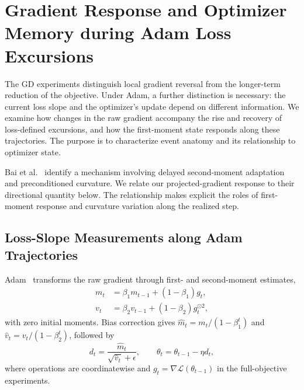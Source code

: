 
\section{Gradient Response and Optimizer Memory during Adam Loss Excursions}
\label{sec:adam-diagnostics}

The GD experiments distinguish local gradient reversal from the longer-term
reduction of the objective. Under Adam, a further distinction is necessary:
the current loss slope and the optimizer's update depend on different
information. We examine how changes in the raw gradient accompany the rise
and recovery of loss-defined excursions, and how the first-moment state
responds along these trajectories. The purpose is to characterize event
anatomy and its relationship to optimizer state.

Bai et al.~\cite{bai2026adaptive} identify a mechanism involving delayed
second-moment adaptation and preconditioned curvature. We relate our
projected-gradient response to their directional quantity below. The
relationship makes explicit the roles of first-moment response and
curvature variation along the realized step.

\subsection{Loss-Slope Measurements along Adam Trajectories}

Adam~\cite{kingma2014adam} transforms the raw gradient through first-
and second-moment estimates,
\begin{equation}
\begin{aligned}
m_t&=\beta_1m_{t-1}+(1-\beta_1)g_t,\\
v_t&=\beta_2v_{t-1}+(1-\beta_2)g_t^{\odot2},
\end{aligned}
\label{eq:adam-moments}
\end{equation}
with zero initial moments. Bias correction gives
$\widehat m_t=m_t/(1-\beta_1^t)$ and
$\widehat v_t=v_t/(1-\beta_2^t)$, followed by
\begin{equation}
d_t=\frac{\widehat m_t}{\sqrt{\widehat v_t}+\epsilon},
\qquad \theta_t=\theta_{t-1}-\eta d_t,
\label{eq:adam-direction}
\end{equation}
where operations are coordinatewise and
$g_t=\nabla\mathcal L(\theta_{t-1})$ in the full-objective experiments.

